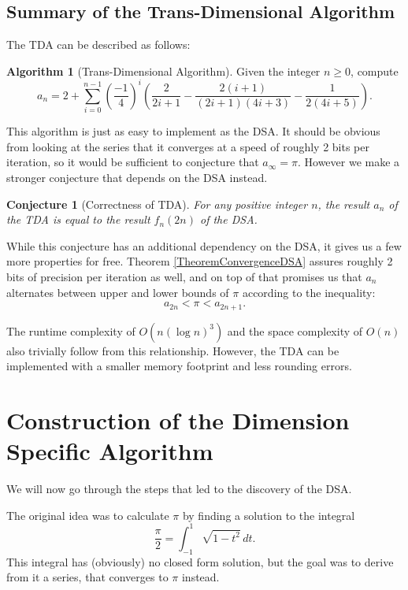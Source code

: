 \documentclass[a4paper,11pt]{scrartcl}
\newcounter{theoremcounter}
\theoremstyle{definition}
\newtheorem{myalgorithm}[theoremcounter]{Algorithm}
\theoremstyle{plain}
\newtheorem{myconjecture}[theoremcounter]{Conjecture}
\theoremstyle{remark}
\begin{document}
\subsection{Summary of the Trans-Dimensional Algorithm}

The TDA can be described as follows:
\begin{myalgorithm}[Trans-Dimensional Algorithm]
\label{AlgorithmTDA}
Given the integer $n \geq 0$, compute
\[
a_n = 2 + \sum_{i=0}^{n-1} \left(\frac{-1}{4}\right)^i
\left(\frac{2}{2i+1} - \frac{2(i+1)}{(2i+1)(4i+3)} - \frac{1}{2(4i+5)}\right).
\]
\end{myalgorithm}

This algorithm is just as easy to implement as the DSA.
It should be obvious from looking at the series that it converges at a speed of roughly 2 bits per iteration, so it would be sufficient to conjecture that $a_\infty = \pi$.
However we make a stronger conjecture that depends on the DSA instead.

\begin{myconjecture}[Correctness of TDA]
\label{ConjectureCorrectnessTDA}
For any positive integer $n$, the result $a_n$ of the TDA is equal to the result $f_n(2n)$ of the DSA.
\end{myconjecture}

While this conjecture has an additional dependency on the DSA, it gives us a few more properties for free.
Theorem \ref{TheoremConvergenceDSA} assures roughly 2 bits of precision per iteration as well, and on top of that promises us that $a_n$ alternates between upper and lower bounds of $\pi$ according to the inequality:
\[
a_{2n} < \pi < a_{2n+1}.
\]

The runtime complexity of $O(n (\log n)^3)$ and the space complexity of $O(n)$ also trivially follow from this relationship.
However, the TDA can be implemented with a smaller memory footprint and less rounding errors.

\section{Construction of the Dimension Specific Algorithm}

We will now go through the steps that led to the discovery of the DSA.

The original idea was to calculate $\pi$ by finding a solution to the integral
\[
\frac{\pi}{2} = \int_{-1}^1 \sqrt{1 - t^2} \, dt.
\]
This integral has (obviously) no closed form solution, but the goal was to derive from it a series, that converges to $\pi$ instead.
\end{document}
